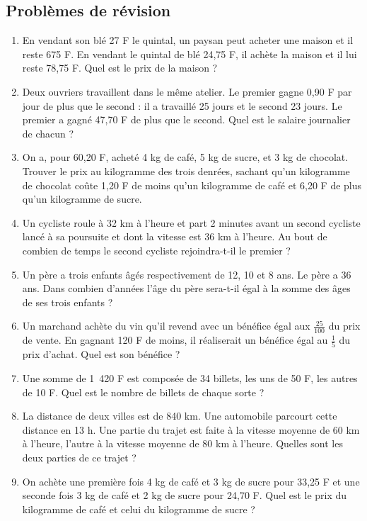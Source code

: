\documentclass[12 pt]{extarticle}
\theoremstyle{plain}
\begin{document}
\begin{enumerate}
 \end{enumerate}
 
 \subsection{Problèmes de révision}
 \begin{enumerate}
 \item En vendant son blé 27 F le quintal, un paysan peut acheter une maison et il reste 675 F. En vendant le quintal de blé 24,75 F, il achète la maison et il lui reste 78,75 F. Quel est le prix de la maison ? 
 \item Deux ouvriers travaillent dans le même atelier. Le premier gagne 0,90 F par jour de plus que le second : il a travaillé 25 jours et le 
 second 23 jours. Le premier a gagné 47,70 F de plus que le second. Quel est le salaire journalier de chacun ? 
 \item On a, pour 60,20 F, acheté 4 kg de café, 5 kg de sucre, et 3 kg de chocolat. Trouver le prix au kilogramme des trois denrées, sachant qu'un kilogramme de chocolat coûte 1,20 F de moins qu'un kilogramme de café et 6,20 F de plus qu'un kilogramme de sucre. 
 \item Un cycliste roule à 32 km à l'heure et part 2 minutes avant un second cycliste lancé à sa poursuite et dont la vitesse est 36 km à l'heure. Au bout de combien de temps le second cycliste rejoindra-t-il 
 le premier ? 
 \item Un père a trois enfants âgés respectivement de 12, 10 et 8 ans. Le père a 36 ans. Dans combien d'années l'âge du père sera-t-il égal à
 la somme des âges de ses trois enfants ?
 \item Un marchand achète du vin qu'il revend avec un bénéfice égal aux $\frac{25}{100}$ du prix de vente. En gagnant 120 F de moins, il réaliserait un bénéfice égal au $\frac15$ du prix d'achat. Quel est
 son bénéfice ? 
 \item Une somme de 1~420 F est composée de 34 billets, les uns de 50 F, les autres de 10 F. Quel est le nombre de billets de chaque 
 sorte ? 
 \item La distance de deux villes est de 840 km. Une automobile parcourt cette distance en 13 h. Une partie du trajet est faite à la vitesse moyenne de 60 km à l'heure, l'autre à la vitesse moyenne de 80 km à l'heure. Quelles sont les deux parties de ce trajet ?
 \item  On achète une première fois 4 kg de café et 3 kg de sucre pour 33,25 F et une seconde fois 3 kg de café et 2 kg de sucre pour 24,70 F. Quel est le prix du kilogramme de café et celui du kilogramme de sucre ? 

\end{enumerate}
\end{document}
